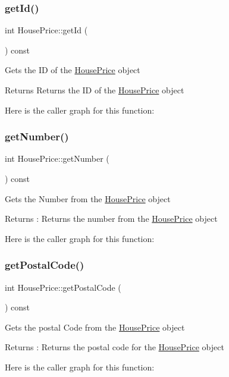 \subsubsection{\texorpdfstring{get\+Id()}{getId()}}
{\footnotesize\ttfamily int House\+Price\+::get\+Id (\begin{DoxyParamCaption}{ }\end{DoxyParamCaption}) const}

Gets the ID of the \hyperlink{class_house_price}{House\+Price} object \begin{DoxyReturn}{Returns}
Returns the ID of the \hyperlink{class_house_price}{House\+Price} object 
\end{DoxyReturn}
Here is the caller graph for this function\+:
\mbox{\label{class_house_price_a41ae809472c6b51d6545f2be4bf566ba}} 
\subsubsection{\texorpdfstring{get\+Number()}{getNumber()}}
{\footnotesize\ttfamily int House\+Price\+::get\+Number (\begin{DoxyParamCaption}{ }\end{DoxyParamCaption}) const}

Gets the Number from the \hyperlink{class_house_price}{House\+Price} object \begin{DoxyReturn}{Returns}
\+: Returns the number from the \hyperlink{class_house_price}{House\+Price} object 
\end{DoxyReturn}
Here is the caller graph for this function\+:
\mbox{\label{class_house_price_aeae03b766a6d1f2ddaed8b9666d1f0c5}} 
\subsubsection{\texorpdfstring{get\+Postal\+Code()}{getPostalCode()}}
{\footnotesize\ttfamily int House\+Price\+::get\+Postal\+Code (\begin{DoxyParamCaption}{ }\end{DoxyParamCaption}) const}

Gets the postal Code from the \hyperlink{class_house_price}{House\+Price} object \begin{DoxyReturn}{Returns}
\+: Returns the postal code for the \hyperlink{class_house_price}{House\+Price} object 
\end{DoxyReturn}
Here is the caller graph for this function\+:
\mbox{\label{class_house_price_ad8f848f687a8de39ce17abf39553a7de}} 
